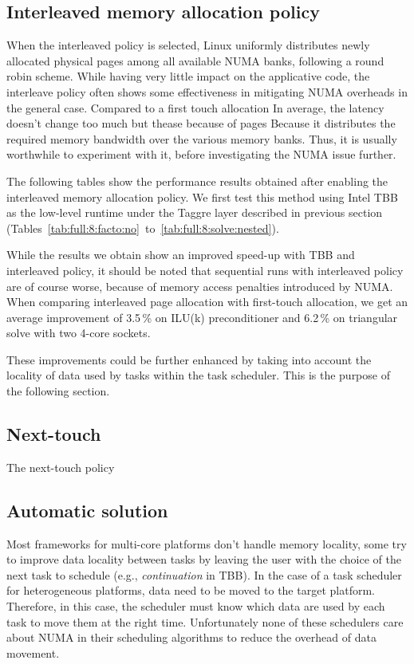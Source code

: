 \subsection{Interleaved memory allocation policy}
When the interleaved policy is selected, Linux uniformly distributes newly allocated physical pages
among all available NUMA banks, following a round robin scheme.
%
While having very little impact on the applicative code, the interleave policy often shows some
effectiveness in mitigating NUMA overheads in the general case.
%
Compared to a first touch allocation
In average, the latency doesn't change too much but thease because of pages Because it distributes the required memory bandwidth over the various memory banks.
%
Thus, it is usually worthwhile to experiment with it, before investigating the NUMA issue further.

The following tables show the performance results obtained after
enabling the interleaved memory allocation policy. We first test this
method using Intel TBB as the low-level runtime under the Taggre layer described in previous section
(Tables~\ref{tab:full:8:facto:no}~to~\ref{tab:full:8:solve:nested}).



While the results we obtain show an improved speed-up with TBB and interleaved policy,
it should be noted that sequential runs with interleaved policy are of
course worse, because of memory access penalties introduced by NUMA.
When comparing
interleaved page allocation with first-touch allocation, we get
an average improvement of 3.5\,\% on ILU(k) preconditioner
and 6.2\,\% on triangular solve with two 4-core sockets.

These improvements could be further enhanced by taking into account the locality of data
used by tasks within the task scheduler. This is the purpose of the
following section.


\subsection{Next-touch}
The next-touch policy
%


\subsection{Automatic solution}
Most frameworks for multi-core platforms don't handle memory locality, some try to improve data locality between tasks by leaving the user with the choice of the next task to schedule (e.g., {\em continuation} in TBB).
%
In the case of a task scheduler for heterogeneous platforms, data need to be moved to the target platform.
Therefore, in this case, the scheduler must know which data are used by each task to move them at the right time.
%
Unfortunately none of these schedulers care about NUMA in their scheduling algorithms to reduce the overhead of data movement.


